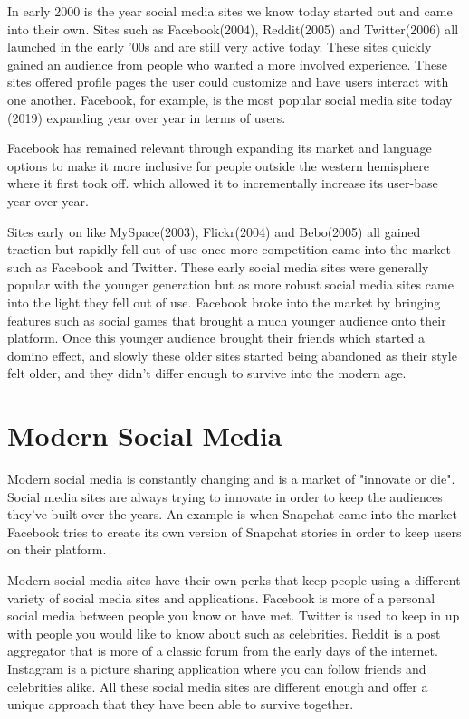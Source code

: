 In early 2000 is the year social media sites we know today started out and came into their own. Sites such as Facebook(2004), Reddit(2005) and Twitter(2006) all launched in the early '00s and are still very active today. These sites quickly gained an audience from people who wanted a more involved experience. These sites offered profile pages the user could customize and have users interact with one another. Facebook, for example, is the most popular social media site today (2019) expanding year over year in terms of users.

Facebook has remained relevant through expanding its market and language options to make it more inclusive for people outside the western hemisphere where it first took off. which allowed it to incrementally increase its user-base year over year.

Sites early on like MySpace(2003), Flickr(2004) and Bebo(2005) all gained traction but rapidly fell out of use once more competition came into the market such as Facebook and Twitter. These early social media sites were generally popular with the younger generation but as more robust social media sites came into the light they fell out of use. Facebook broke into the market by bringing features such as social games that brought a much younger audience onto their platform. Once this younger audience brought their friends which started a domino effect, and slowly these older sites started being abandoned as their style felt older, and they didn't differ enough to survive into the modern age.

\section{Modern Social Media}
Modern social media is constantly changing and is a market of "innovate or die". Social media sites are always trying to innovate in order to keep the audiences they've built over the years. An example is when Snapchat came into the market Facebook tries to create its own version of Snapchat stories in order to keep users on their platform.

Modern social media sites have their own perks that keep people using a different variety of social media sites and applications. Facebook is more of a personal social media between people you know or have met. Twitter is used to keep in up with people you would like to know about such as celebrities. Reddit is a post aggregator that is more of a classic forum from the early days of the internet. Instagram is a picture sharing application where you can follow friends and celebrities alike. All these social media sites are different enough and offer a unique approach that they have been able to survive together. 


